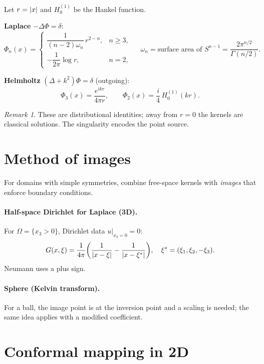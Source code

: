 \documentclass[11pt]{article}
\theoremstyle{definition}
\theoremstyle{remark}
\newtheorem{remark}[theorem]{Remark}
\newcommand{\Om}{\Omega}
\begin{document}
	Let $r=\abs{x}$ and $H_0^{(1)}$ be the Hankel function.
	
	\begin{tcolorbox}
		\textbf{Laplace} $-\Delta\Phi=\delta$:
		\[
		\Phi_n(x)=\begin{cases}
			\dfrac{1}{(n-2)\omega_n}\,r^{2-n}, & n\ge3,\\[8pt]
			-\dfrac{1}{2\pi}\log r, & n=2,
		\end{cases}
		\quad\ \omega_n=\text{surface area of }S^{n-1}=\dfrac{2\pi^{n/2}}{\Gamma(n/2)}.
		\]
	\end{tcolorbox}
	
	\begin{tcolorbox}
		\textbf{Helmholtz} $(\Delta+k^2)\Phi=\delta$ (outgoing):
		\[
		\Phi_3(x)=\frac{e^{ik r}}{4\pi r},\qquad
		\Phi_2(x)=\frac{i}{4}\,H_0^{(1)}(k r).
		\]
	\end{tcolorbox}
	
	\begin{remark}
		These are distributional identities; away from $r=0$ the kernels are classical solutions.
		The singularity encodes the point source.
	\end{remark}
	
	\section{Method of images}
	
	For domains with simple symmetries, combine free-space kernels with \emph{images} that enforce
	boundary conditions.
	
	\paragraph{Half-space Dirichlet for Laplace (3D).} For $\Om=\{x_3>0\}$, Dirichlet data $u|_{x_3=0}=0$:
	\[
	G(x,\xi)=\frac{1}{4\pi}\bigg(\frac{1}{\abs{x-\xi}}-\frac{1}{\abs{x-\xi^\ast}}\bigg),
	\quad \xi^\ast=(\xi_1,\xi_2,-\xi_3).
	\]
	Neumann uses a plus sign.
	
	\paragraph{Sphere (Kelvin transform).} For a ball, the image point is at the inversion point and
	a scaling is needed; the same idea applies with a modified coefficient.
	
	\section{Conformal mapping in 2D}
	
\end{document}
